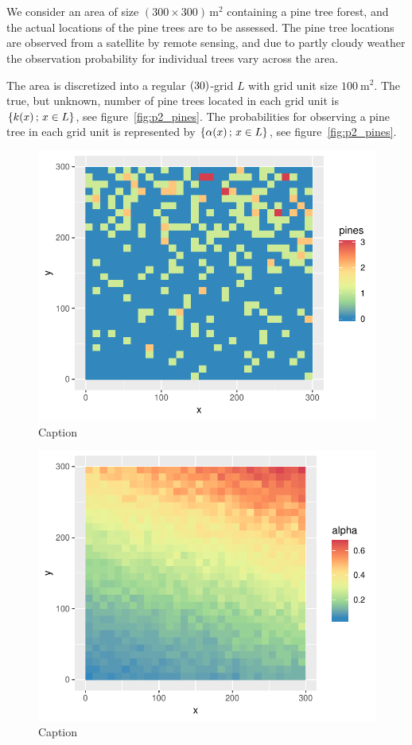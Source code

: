 \section{}
\label{sec:problem2}

We consider an area of size $(300 \times 300) \, \si{\meter^2}$ containing a pine tree forest, and the actual locations of the pine trees are to be assessed. The pine tree locations are observed from a satellite by remote sensing, and due to partly cloudy weather the observation probability for individual trees vary across the area.

The area is discretized into a regular $(30 \time 30)$-grid $L$ with grid unit size $\SI{100}{\meter^2}$. The true, but unknown, number of pine trees located in each grid unit is $\{k(x) \,;\, x \in L\}$, see figure~\ref{fig:p2_pines}. The probabilities for observing a pine tree in each grid unit is represented by $\{\alpha(x) \,;\, x \in L\}$, see figure~\ref{fig:p2_pines}.

\begin{figure}
    \centering
    \includegraphics{figures/p2_pines.pdf}
    \caption{Caption}
    \label{fig:p2_pines_plot}
\end{figure}

\begin{figure}
    \centering
    \includegraphics{figures/p2_alpha.pdf}
    \caption{Caption}
    \label{fig:p2_alpha}
\end{figure}